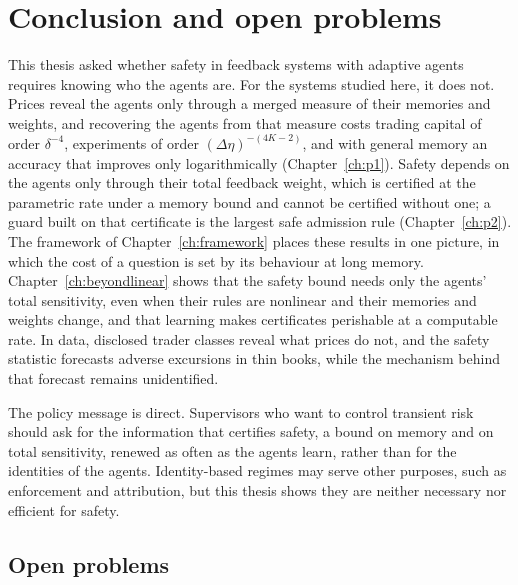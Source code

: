 \chapter{Conclusion and open problems}\label{ch:conclusion}

This thesis asked whether safety in feedback systems with adaptive agents requires knowing who the agents are. For the systems studied here, it does not. Prices reveal the agents only through a merged measure of their memories and weights, and recovering the agents from that measure costs trading capital of order $\delta^{-4}$, experiments of order $(\Delta\eta)^{-(4K-2)}$, and with general memory an accuracy that improves only logarithmically (Chapter~\ref{ch:p1}). Safety depends on the agents only through their total feedback weight, which is certified at the parametric rate under a memory bound and cannot be certified without one; a guard built on that certificate is the largest safe admission rule (Chapter~\ref{ch:p2}). The framework of Chapter~\ref{ch:framework} places these results in one picture, in which the cost of a question is set by its behaviour at long memory. Chapter~\ref{ch:beyondlinear} shows that the safety bound needs only the agents' total sensitivity, even when their rules are nonlinear and their memories and weights change, and that learning makes certificates perishable at a computable rate. In data, disclosed trader classes reveal what prices do not, and the safety statistic forecasts adverse excursions in thin books, while the mechanism behind that forecast remains unidentified.

The policy message is direct. Supervisors who want to control transient risk should ask for the information that certifies safety, a bound on memory and on total sensitivity, renewed as often as the agents learn, rather than for the identities of the agents. Identity-based regimes may serve other purposes, such as enforcement and attribution, but this thesis shows they are neither necessary nor efficient for safety.

\section*{Open problems}

